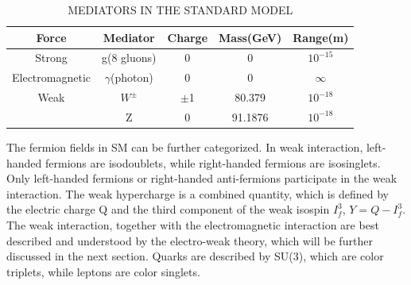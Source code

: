 \begin{table}[htp]
\caption{MEDIATORS IN THE STANDARD MODEL}
\begin{center}
\begin{tabular}{|c|c|c|c|c|}
\hline
Force & Mediator & Charge & Mass(GeV) & Range(m)   \\\hline
Strong                & g(8 gluons)                  & 0 & 0 & $10^{-15}$   \\\hline
Electromagnetic & $\gamma$(photon)     & 0 & 0 &   $\infty$   \\\hline
Weak                  &  $W^{\pm}$                &$\pm$1 & 80.379 &$10^{-18}$\\
                           & Z                                &  0         & 91.1876 &  $10^{-18}$ \\\hline
\end{tabular}
\end{center}
\label{Mediator_infor}
\end{table}%


The fermion fields in SM can be further categorized. In weak interaction, left-handed fermions are isodoublets, while right-handed fermions are isosinglets. Only left-handed fermions or right-handed anti-fermions participate in the weak interaction. The weak hypercharge is a combined quantity, which is defined by the electric charge Q and the third component of the weak isospin $I^{3}_{f}$, $Y=Q-I^{3}_{f}$. The weak interaction, together with the electromagnetic interaction are best described and understood by the electro-weak theory, which will be further discussed in the next section.  Quarks are described by SU(3), which are color triplets, while leptons are color singlets.   

